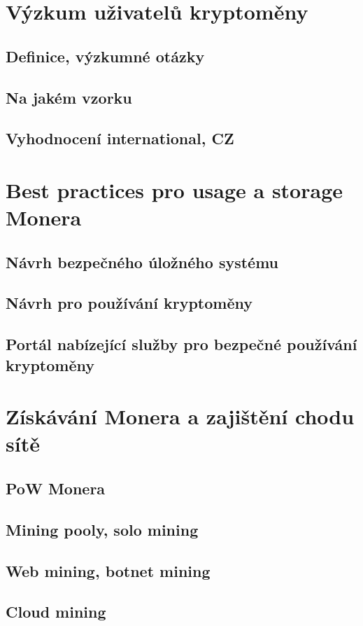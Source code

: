 \documentclass[
  printed, %
  table,   %
  nolof,     %
  nolot,     %
           oneside, color
]{fithesis3}
\begin{document}
\chapter{Výzkum uživatelů kryptoměny}
\section{Definice, výzkumné otázky}
\section{Na jakém vzorku}
\section{Vyhodnocení international, CZ}

\chapter{Best practices pro usage a storage Monera}
\section{Návrh bezpečného úložného systému}
\section{Návrh pro používání kryptoměny}
\section{Portál nabízející služby pro bezpečné používání kryptoměny}



\chapter{Získávání Monera a zajištění chodu sítě}
\section{PoW Monera}
\section{Mining pooly, solo mining}
\section{Web mining, botnet mining}
\section{Cloud mining}
\end{document}
